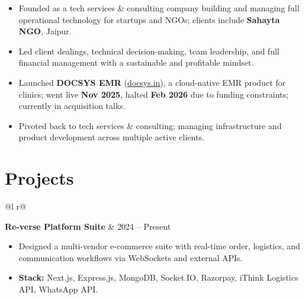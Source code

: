 \documentclass[a4paper,10pt]{article}
\begin{document}
\begin{itemize}[nosep, leftmargin=1.5em, itemsep=0pt, topsep=0pt]

\item Founded as a tech services \& consulting company building and managing full operational technology for startups and NGOs; clients include \textbf{Sahayta NGO}, Jaipur.

\item Led client dealings, technical decision-making, team leadership, and full financial management with a sustainable and profitable mindset.

\item Launched \textbf{DOCSYS EMR} (\href{https://docsys.in}{docsys.in}), a cloud-native EMR product for clinics; went live \textbf{Nov 2025}, halted \textbf{Feb 2026} due to funding constraints; currently in acquisition talks.

\item Pivoted back to tech services \& consulting; managing infrastructure and product development across multiple active clients.

\end{itemize}




\section{Projects}



\begin{tabularx}{\linewidth}{ @{}l r@{} }

\textbf{Re-verse Platform Suite} & \textcolor[HTML]{371e77}{2024 -- Present} \\


\end{tabularx}

\vspace{-8pt}

\begin{itemize}[nosep, leftmargin=1.5em, itemsep=0pt, topsep=0pt]

\item Designed a multi-vendor e-commerce suite with real-time order, logistics, and communication workflows via WebSockets and external APIs.

\item \textbf{Stack:} Next.js, Express.js, MongoDB, Socket.IO, Razorpay, iThink Logistics API, WhatsApp API.

\end{itemize}
\end{document}
